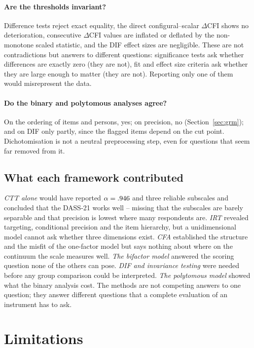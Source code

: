 \documentclass[11pt,a4paper]{article}
\begin{document}
\paragraph{Are the thresholds invariant?} Difference tests reject exact equality, the
direct configural--scalar $\Delta$CFI shows no deterioration, consecutive $\Delta$CFI
values are inflated or deflated by the non-monotone scaled statistic, and the DIF effect
sizes are negligible. These are not contradictions but answers to different questions:
significance tests ask whether differences are exactly zero (they are not), fit and effect
size criteria ask whether they are large enough to matter (they are not). Reporting only
one of them would misrepresent the data.

\paragraph{Do the binary and polytomous analyses agree?} On the ordering of items and
persons, yes; on precision, no (Section~\ref{sec:grm}); and on DIF only partly, since the
flagged items depend on the cut point. Dichotomisation is not a neutral preprocessing step,
even for questions that seem far removed from it.

\subsection{What each framework contributed}

\emph{CTT alone} would have reported $\alpha=.946$ and three reliable subscales and
concluded that the DASS-21 works well -- missing that the subscales are barely separable
and that precision is lowest where many respondents are. \emph{IRT} revealed targeting,
conditional precision and the item hierarchy, but a unidimensional model cannot ask
whether three dimensions exist. \emph{CFA} established the structure and the misfit of the
one-factor model but says nothing about where on the continuum the scale measures well.
\emph{The bifactor model} answered the scoring question none of the others can pose.
\emph{DIF and invariance testing} were needed before any group comparison could be
interpreted. \emph{The polytomous model} showed what the binary analysis cost. The methods
are not competing answers to one question; they answer different questions that a
complete evaluation of an instrument has to ask.

\section{Limitations}\label{sec:limitations}
\end{document}
